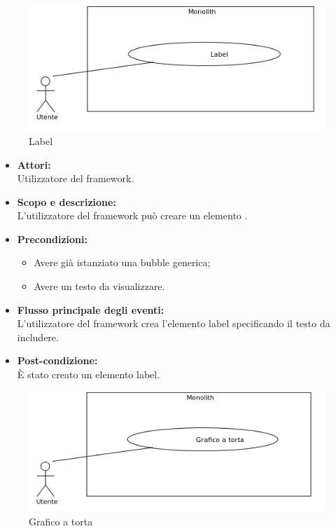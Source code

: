\begin{samepage}
\nopagebreak
\begin{figure}[H]
	\centering
	\includegraphics[width=15cm]{../../documenti/AnalisiDeiRequisiti/Diagrammi_img/uc1_27.png}
	\caption{\UCFFCaption{} Label}
\end{figure}
\end{samepage}

\begin{itemize}
	\item \textbf{Attori:}
	\\Utilizzatore del framework.
	\item \textbf{Scopo e descrizione:} 
	\\L'utilizzatore del framework può creare un elemento .
	\item \textbf{Precondizioni:}
	\begin{itemize}
		\item Avere già istanziato una bubble generica;
		\item Avere un testo da visualizzare.
	\end{itemize}
	\item \textbf{Flusso principale degli eventi:}
	\\L'utilizzatore del framework crea l'elemento label specificando il testo da includere.
	\item \textbf{Post-condizione:}
	\\È stato creato un elemento label.
\end{itemize}

\begin{samepage}
\nopagebreak
\begin{figure}[H]
	\centering
	\includegraphics[width=15cm]{../../documenti/AnalisiDeiRequisiti/Diagrammi_img/uc1_28.png}
	\caption{\UCFFCaption{} Grafico a torta}
\end{figure}
\end{samepage}

